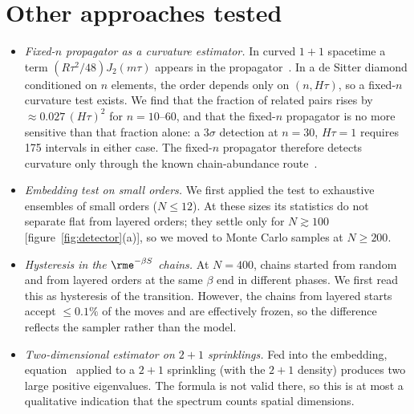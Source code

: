 \documentclass[12pt]{iopart}
\begin{document}
\section{Other approaches tested}\label{app:dropped}
\begin{itemize}
\item \emph{Fixed-$n$ propagator as a curvature estimator.} In curved $1+1$ spacetime a term $(R\tau^2/48)J_2(m\tau)$ appears in the propagator~\cite{NXDS17}. In a de Sitter diamond conditioned on $n$ elements, the order depends only on $(n,H\tau)$, so a fixed-$n$ curvature test exists. We find that the fraction of related pairs rises by $\approx0.027\,(H\tau)^2$ for $n=10$--$60$, and that the fixed-$n$ propagator is no more sensitive than that fraction alone: a $3\sigma$ detection at $n=30$, $H\tau=1$ requires 175 intervals in either case. The fixed-$n$ propagator therefore detects curvature only through the known chain-abundance route~\cite{RSS13}.
\item \emph{Embedding test on small orders.} We first applied the test to exhaustive ensembles of small orders ($N\leq12$). At these sizes its statistics do not separate flat from layered orders; they settle only for $N\gtrsim100$ [figure~\ref{fig:detector}(a)], so we moved to Monte Carlo samples at $N\geq200$.
\item \emph{Hysteresis in the $\rme^{-\beta S}$ chains.} At $N=400$, chains started from random and from layered orders at the same $\beta$ end in different phases. We first read this as hysteresis of the transition. However, the chains from layered starts accept $\leq0.1\%$ of the moves and are effectively frozen, so the difference reflects the sampler rather than the model.
\item \emph{Two-dimensional estimator on $2+1$ sprinklings.} Fed into the embedding, equation~ applied to a $2+1$ sprinkling (with the $2+1$ density) produces two large positive eigenvalues. The formula is not valid there, so this is at most a qualitative indication that the spectrum counts spatial dimensions.
\end{itemize}
\end{document}
